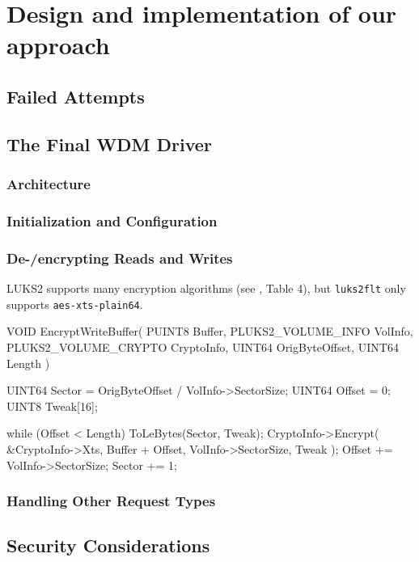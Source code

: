 \section{Design and implementation of our approach}
\label{chap:ourapproach}

\subsection{Failed Attempts}
\label{chap:ourapproach.failed}


\subsection{The Final WDM Driver}
\label{chap:ourapproach.final}

\subsubsection{Architecture}
\label{chap:ourapproach.final.architecture}

\subsubsection{Initialization and Configuration}
\label{chap:ourapproach.final.init}

\subsubsection{De-/encrypting Reads and Writes}
\label{chap:ourapproach.final.de_encrypting}


LUKS2 supports many encryption algorithms (see \cite{Broz2018}, Table 4), but \texttt{luks2flt} only supports \texttt{aes-xts-plain64}.

\begin{ccode}
VOID
EncryptWriteBuffer(
    PUINT8 Buffer,
    PLUKS2_VOLUME_INFO VolInfo,
    PLUKS2_VOLUME_CRYPTO CryptoInfo,
    UINT64 OrigByteOffset,
    UINT64 Length
)
{
    UINT64 Sector = OrigByteOffset / VolInfo->SectorSize;
    UINT64 Offset = 0;
    UINT8 Tweak[16];

    while (Offset < Length) {
        ToLeBytes(Sector, Tweak);
        CryptoInfo->Encrypt(
            &CryptoInfo->Xts, Buffer + Offset,
            VolInfo->SectorSize, Tweak
        );
        Offset += VolInfo->SectorSize;
        Sector += 1;
    }
}
\end{ccode}

\subsubsection{Handling Other Request Types}
\label{chap:ourapproach.final.otherrequests}

\subsection{Security Considerations}
\label{chap:ourapproach.security}
